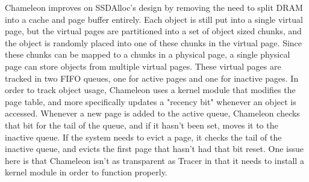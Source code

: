 Chameleon \cite{Chameleon} improves on SSDAlloc's design by removing the need to split DRAM into a cache and page buffer entirely. Each object is still put into a single virtual page, but the virtual pages are partitioned into a set of object sized chunks, and the object is randomly placed into one of these chunks in the virtual page. Since these chunks can be mapped to a chunks in a physical page, a single physical page can store objects from multiple virtual pages. These virtual pages are tracked in two FIFO queues, one for active pages and one for inactive pages. In order to track object usage, Chameleon uses a kernel module that modifies the page table, and more specifically updates a "recency bit" whenever an object is accessed. Whenever a new page is added to the active queue, Chameleon checks that bit for the tail of the queue, and if it hasn't been set, moves it to the inactive queue. If the system needs to evict a page, it checks the tail of the inactive queue, and evicts the first page that hasn't had that bit reset. One issue here is that Chameleon isn't as transparent as Tracer in that it needs to install a kernel module in order to function properly.

